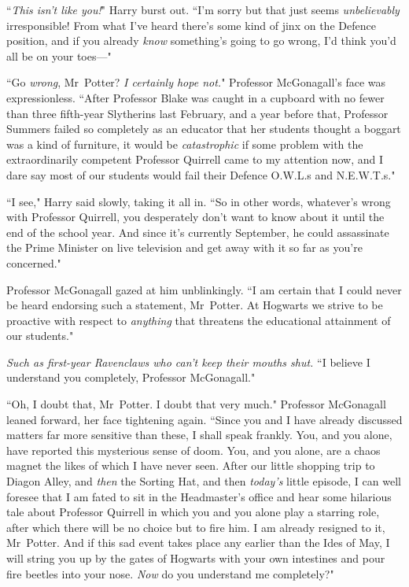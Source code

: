 ``\emph{This isn't like you!}" Harry burst out. ``I'm sorry but that just seems \emph{unbelievably} irresponsible! From what I've heard there's some kind of jinx on the Defence position, and if you already \emph{know} something's going to go wrong, I'd think you'd all be on your toes—"

``Go \emph{wrong}, Mr~Potter? \emph{I certainly hope not.}" Professor McGonagall's face was expressionless. ``After Professor Blake was caught in a cupboard with no fewer than three fifth-year Slytherins last February, and a year before that, Professor Summers failed so completely as an educator that her students thought a boggart was a kind of furniture, it would be \emph{catastrophic} if some problem with the extraordinarily competent Professor Quirrell came to my attention now, and I dare say most of our students would fail their Defence O.W.L.s and N.E.W.T.s."

``I see," Harry said slowly, taking it all in. ``So in other words, whatever's wrong with Professor Quirrell, you desperately don't want to know about it until the end of the school year. And since it's currently September, he could assassinate the Prime Minister on live television and get away with it so far as you're concerned."

Professor McGonagall gazed at him unblinkingly. ``I am certain that I could never be heard endorsing such a statement, Mr~Potter. At Hogwarts we strive to be proactive with respect to \emph{anything} that threatens the educational attainment of our students."

\emph{Such as first-year Ravenclaws who can't keep their mouths shut.} ``I believe I understand you completely, Professor McGonagall."

``Oh, I doubt that, Mr~Potter. I doubt that very much." Professor McGonagall leaned forward, her face tightening again. ``Since you and I have already discussed matters far more sensitive than these, I shall speak frankly. You, and you alone, have reported this mysterious sense of doom. You, and you alone, are a chaos magnet the likes of which I have never seen. After our little shopping trip to Diagon Alley, and \emph{then} the Sorting Hat, and then \emph{today's} little episode, I can well foresee that I am fated to sit in the Headmaster's office and hear some hilarious tale about Professor Quirrell in which you and you alone play a starring role, after which there will be no choice but to fire him. I am already resigned to it, Mr~Potter. And if this sad event takes place any earlier than the Ides of May, I will string you up by the gates of Hogwarts with your own intestines and pour fire beetles into your nose. \emph{Now} do you understand me completely?"

